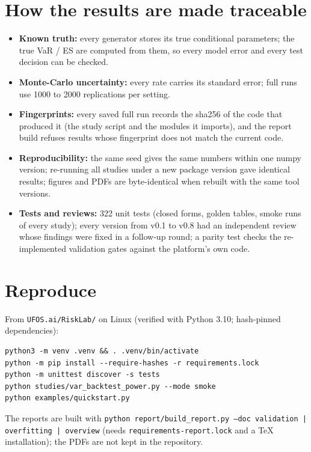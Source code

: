 \documentclass[11pt,a4paper]{article}
\begin{document}


\section*{How the results are made traceable}
\begin{itemize}
\item \textbf{Known truth:} every generator stores its true conditional parameters; the true VaR / ES are
  computed from them, so every model error and every test decision can be checked.
\item \textbf{Monte-Carlo uncertainty:} every rate carries its standard error; full runs use 1000 to 2000
  replications per setting.
\item \textbf{Fingerprints:} every saved full run records the sha256 of the code that produced it (the study
  script and the modules it imports), and the report build refuses results whose fingerprint does not match the
  current code.
\item \textbf{Reproducibility:} the same seed gives the same numbers within one numpy version; re-running all
  studies under a new package version gave identical results; figures and PDFs are byte-identical when rebuilt
  with the same tool versions.
\item \textbf{Tests and reviews:} 322 unit tests (closed forms, golden tables, smoke runs of every study); every
  version from v0.1 to v0.8 had an independent review whose findings were fixed in a follow-up round; a parity test checks the re-implemented
  validation gates against the platform's own code.
\end{itemize}

\section*{Reproduce}
From \texttt{UFOS.ai/RiskLab/} on Linux (verified with Python 3.10; hash-pinned dependencies):
\begin{verbatim}
python3 -m venv .venv && . .venv/bin/activate
python -m pip install --require-hashes -r requirements.lock
python -m unittest discover -s tests
python studies/var_backtest_power.py --mode smoke
python examples/quickstart.py
\end{verbatim}
The reports are built with \texttt{python report/build\_report.py --doc validation | overfitting | overview}
(needs \texttt{requirements-report.lock} and a TeX installation); the PDFs are not kept in the repository.
\end{document}
